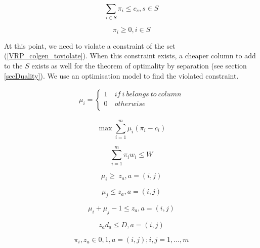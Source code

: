 \begin{equation}
    \sum_{i\in S}{\pi_i\le c_s}, s\in S
    \label{VRP_colgen_toviolate}
\end{equation}

\begin{equation}
    \pi_i\geq0, i\in S
\end{equation}

At this point, we need to violate a constraint of the set (\ref{VRP_colgen_toviolate}). When this constraint exists, a cheaper column to add to the $S$ exists as well for the theorem of optimality by separation (see section \ref{secDuality}). We use an optimisation model to find the violated constraint.

\begin{equation}
   \begin{split}
   \mu_i=\left\{
                \begin{array}{ll}
                  1\ & if\ i\ belongs\ to\ column\\
                  0 & otherwise\\
                \end{array}
              \right.
   \end{split}
\end{equation}

\begin{equation}
    \max{\sum_{i=1}^{m}{\mu_i(\pi_i-c_i)}}
\end{equation}

\begin{equation}
    \sum_{i=1}^{m}{\pi_iw_i\le W}
\end{equation}

\begin{equation}
    \mu_i\geq\ z_a , a=(i,j)
\end{equation}

\begin{equation}
    \mu_j\le z_a , a=(i,j)
\end{equation}

\begin{equation}
    \mu_i+\mu_j-1\le z_a , a=(i,j)
\end{equation}

\begin{equation}
    z_ad_a\le D , a=(i,j)
\end{equation}

\begin{equation}
    \pi_i,z_a\in{0,1} , a=\left(i,j\right);i,j=1,\ldots,m
\end{equation}

